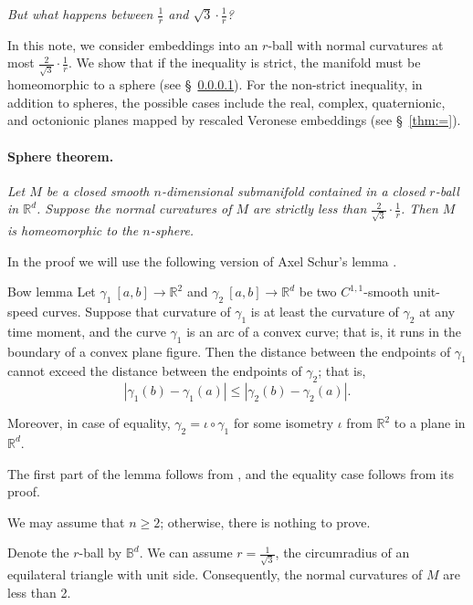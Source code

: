 \documentclass[a4paper,10pt]{article}
\begin{document}
\textit{But what happens between \( \tfrac{1}{r} \) and \( \sqrt{3} \cdot \tfrac{1}{r} \)?}

In this note, we consider embeddings into an \(r\)-ball with normal curvatures at most \( \tfrac{2}{\sqrt{3}} \cdot \tfrac{1}{r} \).
We show that if the inequality is strict, the manifold must be homeomorphic to a sphere (see §~\ref{thm:strict}).
For the non-strict inequality, in addition to spheres, the possible cases include the real, complex, quaternionic, and octonionic planes mapped by rescaled Veronese embeddings (see §~\ref{thm:=}).


\paragraph{Sphere theorem.}
\label{thm:strict}
\textit{Let \( M \) be a closed smooth \( n \)-dimensional submanifold contained in a closed \( r \)-ball in \( \mathbb{R}^d \).
Suppose the normal curvatures of \( M \) are strictly less than \( \tfrac{2}{\sqrt{3}} \cdot \tfrac{1}{r} \).
Then \( M \) is homeomorphic to the \( n \)-sphere.}

\medskip


In the proof we will use the following version of Axel Schur's lemma \cite{shur}.

\begin{thm}{Bow lemma}
Let $\gamma_1\:[a,b]\to\mathbb{R}^2$ and $\gamma_2\:[a,b] \to\mathbb{R}^d$ be two $C^{1,1}$-smooth unit-speed curves.
Suppose that curvature of $\gamma_1$ is at least the curvature of $\gamma_2$ at any time moment,
and the curve
$\gamma_1$ is an arc of a convex curve; that is, it runs in the boundary of a convex plane figure.
Then the distance between the endpoints of $\gamma_1$ cannot exceed the  distance between the endpoints of $\gamma_2$; that is,
\[|\gamma_1(b)-\gamma_1(a)|\leqslant |\gamma_2(b)-\gamma_2(a)|.\]

Moreover, in case of equality, $\gamma_2=\iota \circ \gamma_1$ for some isometry $\iota$ from $\mathbb{R}^2$ to a plane in $\mathbb{R}^d$.
\end{thm}

The first part of the lemma follows from \cite[Theorem 5.1]{sullivan}, and the equality case follows from its proof.


We may assume that \( n \geqslant 2 \);
otherwise, there is nothing to prove.

Denote the \( r \)-ball by \( \mathbb{B}^d \).
We can assume \( r = \tfrac{1}{\sqrt{3}} \), the circumradius of an equilateral triangle with unit side.
Consequently, the normal curvatures of \( M \) are less than 2.
\end{document}
